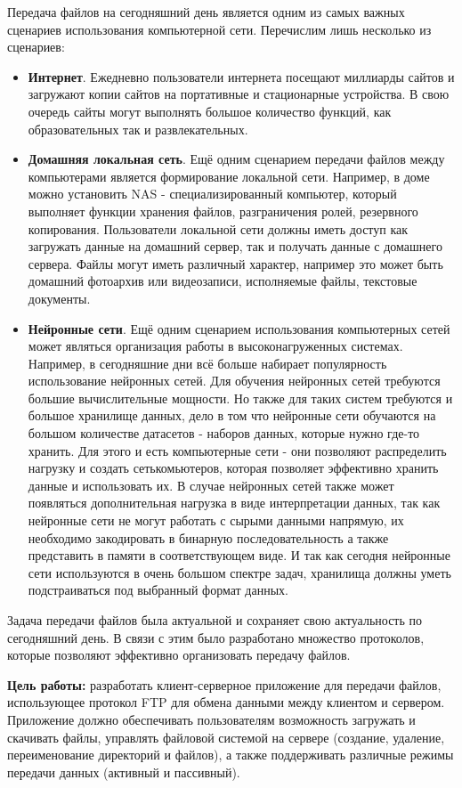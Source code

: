 \documentclass[a4paper,14pt]{extarticle}
\begin{document}
Передача файлов на сегодняшний день является одним из самых важных 
сценариев использования компьютерной сети. Перечислим лишь несколько из сценариев:
\begin{itemize}
\item \textbf{Интернет}. Ежедневно пользователи
интернета посещают миллиарды сайтов и загружают копии 
сайтов на портативные и стационарные устройства. В свою очередь 
сайты могут выполнять большое количество функций, как образовательных
так и развлекательных. 
\item \textbf{Домашняя локальная сеть}. Ещё одним сценарием передачи файлов между 
компьютерами является формирование локальной сети. Например, 
в доме можно установить NAS - специализированный компьютер, который 
выполняет функции хранения файлов, разграничения ролей, резервного копирования. 
Пользователи локальной сети должны иметь доступ как загружать данные 
на домашний сервер, так и получать данные с домашнего сервера. Файлы могут иметь различный характер, 
например это может быть домашний фотоархив или видеозаписи, исполняемые файлы, 
текстовые документы. 
\item \textbf{Нейронные сети}. Ещё одним сценарием использования компьютерных 
сетей может являться организация работы в высоконагруженных системах. 
Например, в сегодняшние дни всё больше набирает популярность использование нейронных
сетей. Для обучения нейронных сетей требуются большие вычислительные
мощности. Но также для таких систем требуются и большое хранилище данных, 
дело в том что нейронные сети обучаются на большом количестве датасетов - наборов данных, 
которые нужно где-то хранить. Для этого и есть компьютерные сети - они позволяют
распределить нагрузку и создать сетькомьютеров, 
которая позволяет эффективно хранить данные и использовать их. В случае нейронных сетей
также может появляться дополнительная нагрузка в виде интерпретации данных, так как
нейронные сети не могут работать с сырыми данными напрямую, их необходимо закодировать
в бинарную последовательность а также представить в памяти в соответствующем виде. 
И так как сегодня нейронные сети используются в очень большом спектре задач, 
хранилища должны уметь подстраиваться под выбранный формат данных.
\end{itemize}

Задача передачи файлов была актуальной и сохраняет свою актуальность
по сегодняшний день. В связи с этим было разработано множество протоколов, 
которые позволяют эффективно организовать передачу файлов.

\textbf{Цель работы:} разработать клиент-серверное приложение для передачи файлов, 
использующее протокол FTP для обмена данными между клиентом и сервером. 
Приложение должно обеспечивать пользователям возможность загружать и скачивать файлы, 
управлять файловой системой на сервере (создание, удаление, переименование 
директорий и файлов), а также поддерживать различные режимы передачи данных (активный и пассивный).
\end{document}
